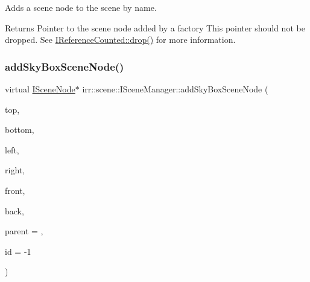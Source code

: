 Adds a scene node to the scene by name. 

\begin{DoxyReturn}{Returns}
Pointer to the scene node added by a factory This pointer should not be dropped. See \hyperlink{classirr_1_1IReferenceCounted_a03856a09355b89d178090c4a5f738543}{I\+Reference\+Counted\+::drop()} for more information. 
\end{DoxyReturn}
\mbox{\label{classirr_1_1scene_1_1ISceneManager_a2b08b9f20ec62faeffc02b9fed9fd683}} 
\subsubsection{\texorpdfstring{add\+Sky\+Box\+Scene\+Node()}{addSkyBoxSceneNode()}\hspace{0.1cm}{\footnotesize\ttfamily [1/2]}}
{\footnotesize\ttfamily virtual \hyperlink{classirr_1_1scene_1_1ISceneNode}{I\+Scene\+Node}$\ast$ irr\+::scene\+::\+I\+Scene\+Manager\+::add\+Sky\+Box\+Scene\+Node (\begin{DoxyParamCaption}\item[{\hyperlink{classirr_1_1video_1_1ITexture}{video\+::\+I\+Texture} $\ast$}]{top,  }\item[{\hyperlink{classirr_1_1video_1_1ITexture}{video\+::\+I\+Texture} $\ast$}]{bottom,  }\item[{\hyperlink{classirr_1_1video_1_1ITexture}{video\+::\+I\+Texture} $\ast$}]{left,  }\item[{\hyperlink{classirr_1_1video_1_1ITexture}{video\+::\+I\+Texture} $\ast$}]{right,  }\item[{\hyperlink{classirr_1_1video_1_1ITexture}{video\+::\+I\+Texture} $\ast$}]{front,  }\item[{\hyperlink{classirr_1_1video_1_1ITexture}{video\+::\+I\+Texture} $\ast$}]{back,  }\item[{\hyperlink{classirr_1_1scene_1_1ISceneNode}{I\+Scene\+Node} $\ast$}]{parent = {},  }\item[{\hyperlink{namespaceirr_ac66849b7a6ed16e30ebede579f9b47c6}{s32}}]{id = {\ttfamily -\/1} }\end{DoxyParamCaption})\hspace{0.3cm}{\ttfamily [pure virtual]}}



